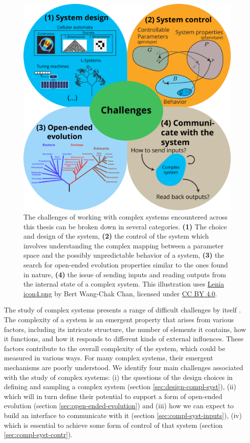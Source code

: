 \begin{figure}[htbp]
  \centering
  \includegraphics[width=.98\linewidth]{figures/challenges}
  \caption{The challenges of working with complex systems encountered across
    this thesis can be broken down in several categories. \textbf{(1)} The choice
    and design of the system, \textbf{(2)} the control of the system which
    involves understanding the complex mapping between a parameter space and the
    possibly unpredictable behavior of a system, \textbf{(3)} the search for
    open-ended evolution properties similar to the ones found in nature,
    \textbf{(4)} the issue of sending inputs and reading outputs from the
    internal state of a complex system. This illustration uses
    \href{https://commons.wikimedia.org/wiki/File:Lenia_icon4.png}{Lenia
      icon4.png} by Bert Wang-Chak Chan, licensed under
    \href{https://creativecommons.org/licenses/by-sa/4.0/}{CC BY 4.0}. }
  \label{fig:challenges}
\end{figure}

The study of complex systems presents a range of difficult challenges by itself
\parencite{sanmiguelChallengesComplexSystems2012}. 
The complexity of a system is an emergent property that arises from various factors, 
including its intricate structure, the number of elements it contains, how it functions, 
and how it responds to different kinds of external influences. These factors contribute 
to the overall complexity of the system, which could be measured in various ways.
For many complex systems, their emergent mechanisms are
poorly understood. We identify four main challenges associated with the study of
complex systems: (i) the questions of the design choices in defining and sampling a
complex system (section \ref{sec:design-compl-syst}), (ii) which will in turn define
their potential to support a form of open-ended evolution (section
\ref{sec:open-ended-evolution}) and (iii) how we can expect to build an interface to
communicate with it (section \ref{sec:compl-syst-inputs}), (iv) which is essential to
achieve some form of control of that system (section \ref{sec:compl-syst-contr}).

